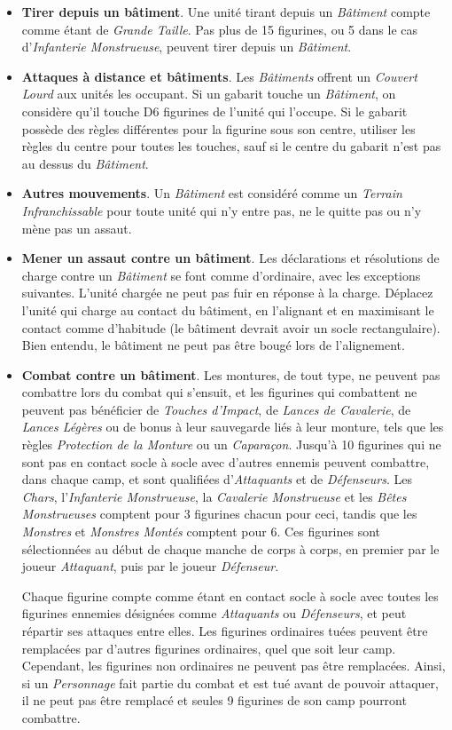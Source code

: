 \begin{itemize}[label={-}]
\item \textbf{Tirer depuis un bâtiment}. Une unité tirant depuis un \emph{Bâtiment} compte comme étant de \emph{Grande Taille}. Pas plus de 15 figurines, ou 5 dans le cas d'\emph{Infanterie Monstrueuse}, peuvent tirer depuis un \emph{Bâtiment}.
\item \textbf{Attaques à distance et bâtiments}. Les \emph{Bâtiments} offrent un \emph{Couvert Lourd} aux unités les occupant. Si un gabarit touche un \emph{Bâtiment}, on considère qu'il touche D6 figurines de l'unité qui l'occupe. Si le gabarit possède des règles différentes pour la figurine sous son centre, utiliser les règles du centre pour toutes les touches, sauf si le centre du gabarit n'est pas au dessus du \emph{Bâtiment}.
\item \textbf{Autres mouvements}. Un \emph{Bâtiment} est considéré comme un \emph{Terrain Infranchissable} pour toute unité qui n'y entre pas, ne le quitte pas ou n'y mène pas un assaut.
\item \textbf{Mener un assaut contre un bâtiment}. Les déclarations et résolutions de charge contre un \emph{Bâtiment} se font comme d'ordinaire, avec les exceptions suivantes. L'unité chargée ne peut pas fuir en réponse à la charge. Déplacez l'unité qui charge au contact du bâtiment, en l'alignant et en maximisant le contact comme d'habitude (le bâtiment devrait avoir un socle rectangulaire). Bien entendu, le bâtiment ne peut pas être bougé lors de l'alignement.
\item \textbf{Combat contre un bâtiment}. Les montures, de tout type, ne peuvent pas combattre lors du combat qui s'ensuit, et les figurines qui combattent ne peuvent pas bénéficier de \emph{Touches d'Impact}, de \emph{Lances de Cavalerie}, de \emph{Lances Légères} ou de bonus à leur sauvegarde liés à leur monture, tels que les règles \emph{Protection de la Monture} ou un \emph{Caparaçon}. Jusqu'à 10 figurines qui ne sont pas en contact socle à socle avec d'autres ennemis peuvent combattre, dans chaque camp, et sont qualifiées d'\emph{Attaquants} et de \emph{Défenseurs}. Les \emph{Chars}, l'\emph{Infanterie Monstrueuse}, la \emph{Cavalerie Monstrueuse} et les \emph{Bêtes Monstrueuses} comptent pour 3 figurines chacun pour ceci, tandis que les \emph{Monstres} et \emph{Monstres Montés} comptent pour 6. Ces figurines sont sélectionnées au début de chaque manche de corps à corps, en premier par le joueur \emph{Attaquant}, puis par le joueur \emph{Défenseur}.

Chaque figurine compte comme étant en contact socle à socle avec toutes les figurines ennemies désignées comme \emph{Attaquants} ou \emph{Défenseurs}, et peut répartir ses attaques entre elles. Les figurines ordinaires tuées peuvent être remplacées par d'autres figurines ordinaires, quel que soit leur camp. Cependant, les figurines non ordinaires ne peuvent pas être remplacées. Ainsi, si un \emph{Personnage} fait partie du combat et est tué avant de pouvoir attaquer, il ne peut pas être remplacé et seules 9 figurines de son camp pourront combattre.


\end{itemize}
